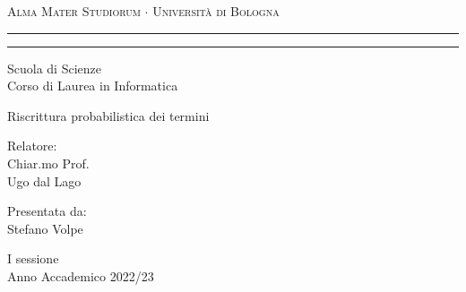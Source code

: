 \begin{titlepage}
	\begin{center}
		{{\Large{\textsc{Alma Mater Studiorum $\cdot$ Universit\`a di
							Bologna}}}} \rule[0.1cm]{15.8cm}{0.1mm}
		\rule[0.5cm]{15.8cm}{0.6mm}
		{\small{Scuola di Scienze \\
				Corso di Laurea in Informatica }}
	\end{center}
	\vspace{15mm}
	\begin{center}
		{\LARGE{Riscrittura probabilistica dei termini}}\\
	\end{center}
	\vspace{40mm}
	\par
	\noindent
	\begin{minipage}[t]{0.47\textwidth}
		{\large{Relatore:\\
				Chiar.mo Prof.\\
				Ugo dal Lago}}
	\end{minipage}
	\hfill
	\begin{minipage}[t]{0.47\textwidth}\raggedleft
		{\large{Presentata da:\\
				Stefano Volpe}}
	\end{minipage}
	\vspace{20mm}
	\begin{center}
		{\large{\RN{1} sessione\\%
				Anno Accademico 2022/23}}%
	\end{center}
\end{titlepage}

\newpage
\null
\thispagestyle{empty}
\newpage

